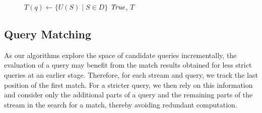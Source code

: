 \begin{figure}[t]
\begin{algorithm}[H]
{{{{				}
			}

		}

	}
	$T(q)\leftarrow \{U(S)\mid  S\in D\}$\;
	\Return $\mathit{True}$, $T$\;

	\BlankLine
\end{algorithm}
\vspace{-1em}
\end{figure}

\subsection{Query Matching}
\label{sec:matching}

As our algorithms explore the space of candidate queries
incrementally, the evaluation of a query may
benefit from the match results obtained for less strict queries at an
earlier stage. Therefore, for each stream and query, we track the
last position of the first match. For a stricter query, we then rely on this
information
and consider only the additional parts of a query and the remaining parts of
the stream in the search for a match, thereby avoiding redundant
computation.

